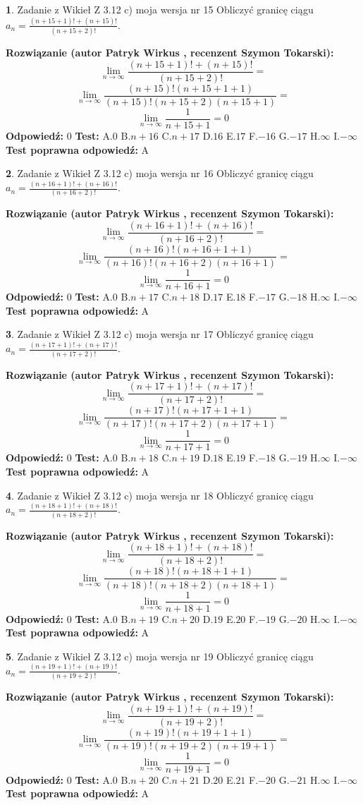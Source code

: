 \documentclass[12pt, a4paper]{article}
\theoremstyle{definition} %
\newtheorem{zad}{}
\newcommand{\zadStart}[1]{\begin{zad}#1\newline}
\newcommand{\zadStop}{\end{zad}}
\newcommand{\rozwStart}[2]{\noindent \textbf{Rozwiązanie (autor #1 , recenzent #2): }\newline}
\newcommand{\rozwStop}{\newline}
\newcommand{\odpStart}{\noindent \textbf{Odpowiedź:}\newline}
\newcommand{\odpStop}{\newline}
\newcommand{\testStart}{\noindent \textbf{Test:}\newline}
\newcommand{\testStop}{\newline}
\newcommand{\kluczStart}{\noindent \textbf{Test poprawna odpowiedź:}\newline}
\newcommand{\kluczStop}{\newline}
\begin{document}
\zadStart{Zadanie z Wikieł Z 3.12 c) moja wersja nr 15}
Obliczyć granicę ciągu $a_{n}=\frac{(n+15+1)!+(n+15)!}{(n+15+2)!}$.
\zadStop
\rozwStart{Patryk Wirkus}{Szymon Tokarski}
$$\lim\limits_{n\to\infty}\frac{(n+15+1)!+(n+15)!}{(n+15+2)!}=$$
$$\lim\limits_{n\to\infty}\frac{(n+15)!(n+15+1+1)}{(n+15)!(n+15+2)(n+15+1)}=$$
$$\lim\limits_{n\to\infty}\frac{1}{n+15+1}= 0$$
\rozwStop
\odpStart
$0$
\odpStop
\testStart
A.$0$
B.$n+16$
C.$n+17$
D.$16$
E.$17$
F.$-16$
G.$-17$
H.$\infty$
I.$-\infty$
\testStop
\kluczStart
A
\kluczStop



\zadStart{Zadanie z Wikieł Z 3.12 c) moja wersja nr 16}
Obliczyć granicę ciągu $a_{n}=\frac{(n+16+1)!+(n+16)!}{(n+16+2)!}$.
\zadStop
\rozwStart{Patryk Wirkus}{Szymon Tokarski}
$$\lim\limits_{n\to\infty}\frac{(n+16+1)!+(n+16)!}{(n+16+2)!}=$$
$$\lim\limits_{n\to\infty}\frac{(n+16)!(n+16+1+1)}{(n+16)!(n+16+2)(n+16+1)}=$$
$$\lim\limits_{n\to\infty}\frac{1}{n+16+1}= 0$$
\rozwStop
\odpStart
$0$
\odpStop
\testStart
A.$0$
B.$n+17$
C.$n+18$
D.$17$
E.$18$
F.$-17$
G.$-18$
H.$\infty$
I.$-\infty$
\testStop
\kluczStart
A
\kluczStop



\zadStart{Zadanie z Wikieł Z 3.12 c) moja wersja nr 17}
Obliczyć granicę ciągu $a_{n}=\frac{(n+17+1)!+(n+17)!}{(n+17+2)!}$.
\zadStop
\rozwStart{Patryk Wirkus}{Szymon Tokarski}
$$\lim\limits_{n\to\infty}\frac{(n+17+1)!+(n+17)!}{(n+17+2)!}=$$
$$\lim\limits_{n\to\infty}\frac{(n+17)!(n+17+1+1)}{(n+17)!(n+17+2)(n+17+1)}=$$
$$\lim\limits_{n\to\infty}\frac{1}{n+17+1}= 0$$
\rozwStop
\odpStart
$0$
\odpStop
\testStart
A.$0$
B.$n+18$
C.$n+19$
D.$18$
E.$19$
F.$-18$
G.$-19$
H.$\infty$
I.$-\infty$
\testStop
\kluczStart
A
\kluczStop



\zadStart{Zadanie z Wikieł Z 3.12 c) moja wersja nr 18}
Obliczyć granicę ciągu $a_{n}=\frac{(n+18+1)!+(n+18)!}{(n+18+2)!}$.
\zadStop
\rozwStart{Patryk Wirkus}{Szymon Tokarski}
$$\lim\limits_{n\to\infty}\frac{(n+18+1)!+(n+18)!}{(n+18+2)!}=$$
$$\lim\limits_{n\to\infty}\frac{(n+18)!(n+18+1+1)}{(n+18)!(n+18+2)(n+18+1)}=$$
$$\lim\limits_{n\to\infty}\frac{1}{n+18+1}= 0$$
\rozwStop
\odpStart
$0$
\odpStop
\testStart
A.$0$
B.$n+19$
C.$n+20$
D.$19$
E.$20$
F.$-19$
G.$-20$
H.$\infty$
I.$-\infty$
\testStop
\kluczStart
A
\kluczStop



\zadStart{Zadanie z Wikieł Z 3.12 c) moja wersja nr 19}
Obliczyć granicę ciągu $a_{n}=\frac{(n+19+1)!+(n+19)!}{(n+19+2)!}$.
\zadStop
\rozwStart{Patryk Wirkus}{Szymon Tokarski}
$$\lim\limits_{n\to\infty}\frac{(n+19+1)!+(n+19)!}{(n+19+2)!}=$$
$$\lim\limits_{n\to\infty}\frac{(n+19)!(n+19+1+1)}{(n+19)!(n+19+2)(n+19+1)}=$$
$$\lim\limits_{n\to\infty}\frac{1}{n+19+1}= 0$$
\rozwStop
\odpStart
$0$
\odpStop
\testStart
A.$0$
B.$n+20$
C.$n+21$
D.$20$
E.$21$
F.$-20$
G.$-21$
H.$\infty$
I.$-\infty$
\testStop
\kluczStart
A
\kluczStop
\end{document}
